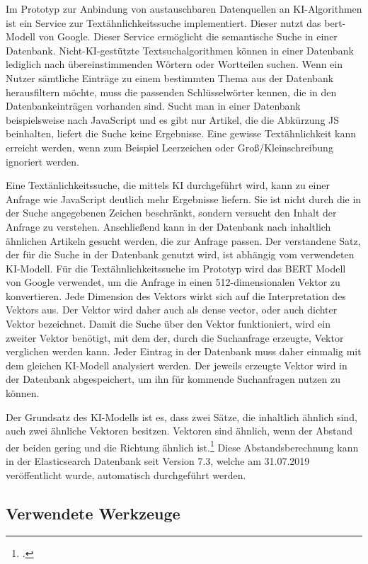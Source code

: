 Im Prototyp zur Anbindung von austauschbaren Datenquellen an KI-Algorithmen ist ein Service zur Textähnlichkeitssuche implementiert. Dieser nutzt das \ac{bert}-Modell von Google. Dieser Service ermöglicht die semantische Suche in einer Datenbank. Nicht-KI-gestützte Textsuchalgorithmen können in einer Datenbank lediglich nach übereinstimmenden Wörtern oder Wortteilen suchen. Wenn ein Nutzer sämtliche Einträge zu einem bestimmten Thema aus der Datenbank herausfiltern möchte, muss die passenden Schlüsselwörter kennen, die in den Datenbankeinträgen vorhanden sind. Sucht man in einer Datenbank beispielsweise nach \glqq JavaScript\grqq{} und es gibt nur Artikel, die die Abkürzung \glqq JS\grqq{} beinhalten, liefert die Suche keine Ergebnisse. Eine gewisse Textähnlichkeit kann erreicht werden, wenn zum Beispiel Leerzeichen oder Groß/Kleinschreibung ignoriert werden. 

Eine Textänlichkeitssuche, die mittels KI durchgeführt wird, kann zu einer Anfrage wie \glqq JavaScript\grqq{} deutlich mehr Ergebnisse liefern. Sie ist nicht durch die in der Suche angegebenen Zeichen beschränkt, sondern versucht den Inhalt der Anfrage zu verstehen. Anschließend kann in der Datenbank nach inhaltlich ähnlichen Artikeln gesucht werden, die zur Anfrage passen. Der \glqq verstandene\grqq{} Satz, der für die Suche in der Datenbank genutzt wird, ist abhängig vom verwendeten KI-Modell. Für die Textähnlichkeitssuche im Prototyp wird das BERT Modell von Google verwendet, um die Anfrage in einen 512-dimensionalen Vektor zu konvertieren. Jede Dimension des Vektors wirkt sich auf die Interpretation des Vektors aus. Der Vektor wird daher auch als \glqq dense vector\grqq{}, oder auch dichter Vektor bezeichnet. Damit die Suche über den Vektor funktioniert, wird ein zweiter Vektor benötigt, mit dem der, durch die Suchanfrage erzeugte, Vektor verglichen werden kann. Jeder Eintrag in der Datenbank muss daher einmalig mit dem gleichen KI-Modell analysiert werden. Der jeweils erzeugte Vektor wird in der Datenbank abgespeichert, um ihn für kommende Suchanfragen nutzen zu können.

Der Grundsatz des KI-Modells ist es, dass zwei Sätze, die inhaltlich ähnlich sind, auch zwei ähnliche Vektoren besitzen. Vektoren sind ähnlich, wenn der Abstand der beiden gering und die Richtung ähnlich ist.\footcite{rahutomo2012semantic} Diese Abstandsberechnung kann in der Elasticsearch Datenbank seit Version 7.3, welche am 31.07.2019 veröffentlicht wurde, automatisch durchgeführt werden. 

\subsection{Verwendete Werkzeuge}
